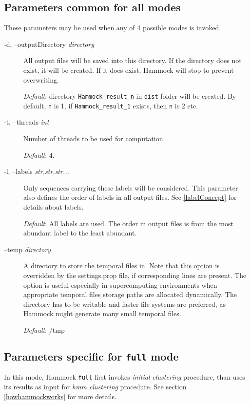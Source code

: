 \documentclass[11pt, a4paper, twoside, titlepage]{article}
\begin{document}
\subsection{Parameters common for all modes}
\label{parametersCommon}
These parameters may be used when any of 4 possible modes is invoked. 

\renewcommand{\ttdefault}{pcr}

\begin{description}
	\item[-d, --outputDirectory \rm \textlangle \textit{directory}\textrangle] All output files will be saved into this directory. If the directory does not exist, it will be created. If it does exist, Hammock will stop to prevent overwriting. 
	 
	  \textit{Default}: directory \texttt{Hammock\_result\_n} in \texttt{dist} folder will be created. By default, \texttt{n} is 1, if \texttt{Hammock\_result\_1} exists, then \texttt{n} is 2 etc. 

\item[-t, --threads \rm \textlangle \textit{int}\textrangle] Number of threads to be used for computation.

 \textit{Default}: 4. 

\item[-l, --labels \rm \textlangle \textit{str,str,str...}\textrangle] Only sequences carrying these labels will be considered. This parameter also defines the order of labels in all output files. See \ref{labelConcept} for details about labels. 

\textit{Default}: All labels are used. The order in output files is from the most abundant label to the least abundant. 

\item[--temp \rm \textlangle \textit{directory}\textrangle] A directory to store the temporal files in. Note that this option is overridden by the settings.prop file, if corresponding lines are present. The option is useful especially in supercomputing environments when appropriate temporal files storage paths are allocated dynamically. The directory has to be writable and faster file systems are preferred, as Hammock might generate many small temporal files.

\textit{Default}: /tmp

	
\end{description}

\subsection{Parameters specific for \texttt{full} mode}
\label{parametersFull}
In this mode, Hammock \texttt{full} first invokes \textit{initial clustering} procedure, than uses its results as input for \textit{hmm clustering} procedure. See section \ref{howhammockworks} for more details.
\end{document}
